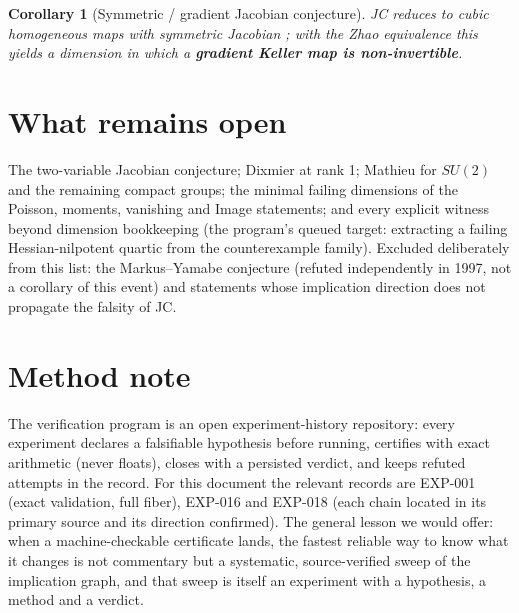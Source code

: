 \documentclass[11pt]{article}
\newtheorem{corollary}{Corollary}
\begin{document}
\begin{corollary}[Symmetric / gradient Jacobian conjecture]
JC reduces to cubic homogeneous maps with symmetric Jacobian \cite{dBvdE2005}; with the Zhao
equivalence this yields a dimension in which a \textbf{gradient Keller map is non-invertible}.
\end{corollary}

\section{What remains open}

The two-variable Jacobian conjecture; Dixmier at rank 1; Mathieu for $SU(2)$ and the remaining
compact groups; the minimal failing dimensions of the Poisson, moments, vanishing and Image
statements; and every explicit witness beyond dimension bookkeeping (the program's queued
target: extracting a failing Hessian-nilpotent quartic from the counterexample family).
Excluded deliberately from this list: the Markus--Yamabe conjecture (refuted independently in
1997, not a corollary of this event) and statements whose implication direction does not
propagate the falsity of JC.

\section{Method note}

The verification program is an open experiment-history repository: every experiment declares a
falsifiable hypothesis before running, certifies with exact arithmetic (never floats), closes
with a persisted verdict, and keeps refuted attempts in the record. For this document the
relevant records are EXP-001 (exact validation, full fiber), EXP-016 and EXP-018 (each chain
located in its primary source and its direction confirmed). The general lesson we would offer:
when a machine-checkable certificate lands, the fastest reliable way to know what it changes is
not commentary but a systematic, source-verified sweep of the implication graph, and that sweep
is itself an experiment with a hypothesis, a method and a verdict.
\end{document}
